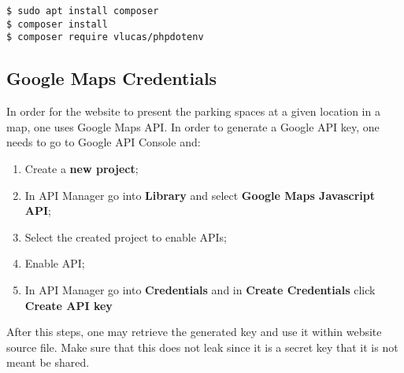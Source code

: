 \begin{lstlisting}
$ sudo apt install composer
$ composer install
$ composer require vlucas/phpdotenv
\end{lstlisting}

\subsection{Google Maps Credentials}
In order for the website to present the parking spaces at a given location in a map, one uses Google Maps API. In order to generate a Google API key, one needs to go to Google API Console \cite{googleapi} and:

\begin{enumerate}
	\item Create a \textbf{new project};
	\item In API Manager go into \textbf{Library} and select \textbf{Google Maps Javascript API};
	\item Select the created project to enable APIs;
	\item Enable API;
	\item In API Manager go into \textbf{Credentials} and in \textbf{Create Credentials} click \textbf{Create API key}	
\end{enumerate}

After this steps, one may retrieve the generated key and use it within website source file. Make sure that this does not leak since it is a secret key that it is not meant be shared.